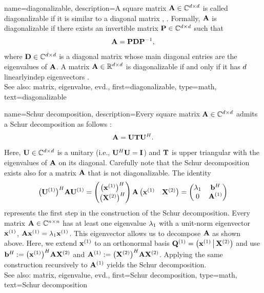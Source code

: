 {name={diagonalizable},
	description={A square \gls{matrix} ${\bf A} \in \mathbb{C}^{d \times d}$ 
		is called diagonalizable if it is similar  
 		to a diagonal \gls{matrix} \cite{HornMatAnalysis}, \cite{Axler2025}. 
 		Formally, ${\bf A}$ is diagonalizable if there exists an \gls{invertible} \gls{matrix} 
		$\mathbf{P} \in \mathbb{C}^{d \times d}$ such that 
  		\[
  			{\bf A} = \mathbf{P} {\bf D} \mathbf{P}^{-1},
  		\]
		where ${\bf D} \in \mathbb{C}^{d \times d}$ is a 
 		diagonal \gls{matrix} whose main diagonal entries are the \glspl{eigenvalue} 
 		of ${\bf A}$. A \gls{matrix} ${\bf A} \in \mathbb{R}^{d \times d}$ 
 		is diagonalizable if and only if it has $d$ \gls{linearlyindep}
 		\glspl{eigenvector} \cite{HornMatAnalysis}. 
 		\\	
 		See also: \gls{matrix}, \gls{eigenvalue}, \gls{evd}.},
 	first={diagonalizable},
 	type=math,
 	text={diagonalizable}
}

{name={Schur decomposition},
	description={Every square \gls{matrix} ${\bf A} \in \mathbb{C}^{d \times d}$ 
		admits a Schur decomposition as follows \cite[Th. 7.1.3]{GolubVanLoanBook}:
		\[
		{\bf A} = \mathbf{U} \mathbf{T} \mathbf{U}^{H}. 
		\]
		Here, $\mathbf{U} \in \mathbb{C}^{d \times d}$ is a \gls{unitary} 
		(i.e., $\mathbf{U}^{H}\mathbf{U} = \mathbf{I}$) and $\mathbf{T}$ is upper triangular 
		with the \glspl{eigenvalue} of ${\bf A}$ on its diagonal.
		Carefully note that the Schur decomposition exists also 
		for a \gls{matrix} ${\bf A}$ that is not \gls{diagonalizable}.
		The identity
		\[
			\big(\mathbf{U}^{(1)}\big)^{H} {\bf A} \mathbf{U}^{(1)}
			=
			\begin{pmatrix}
			\big({\bf x}^{(1)}\big)^{H} \\
			\big({\bf X}^{(2)}\big)^{H}
			\end{pmatrix}
			{\bf A}
			\begin{pmatrix}
			{\bf x}^{(1)} & {\bf X}^{(2)}
			\end{pmatrix}
			=
			\begin{pmatrix}
			\lambda_{1} & {\bf b}^{H} \\
			0 & {\bf A}^{(1)}
			\end{pmatrix}
		\]
		represents the first step in the construction of the Schur decomposition.
		Every \gls{matrix} ${\bf A} \in \mathbb{C}^{n\times n}$ has at least one 
		\gls{eigenvalue} $\lambda_{1}$ with a unit-\gls{norm} \gls{eigenvector} 
		${\bf x}^{(1)}$, ${\bf A} {\bf x}^{(1)} = \lambda_{1} {\bf x}^{(1)}$. This 
		\gls{eigenvector} allows us to decompose ${\bf A}$ as shown above. Here, 
		we extend ${\bf x}^{(1)}$ to an orthonormal \gls{basis}
		$\mathbf{Q}^{(1)} = \big( {\bf x}^{(1)} \,\big|\, {\bf X}^{(2)} \big)$
		and use ${\bf b}^{H} := \big({\bf x}^{(1)}\big)^{H} {\bf A} {\bf X}^{(2)}$ and 
		${\bf A}^{(1)} := \big({\bf X}^{(2)}\big)^{H} {\bf A} {\bf X}^{(2)}$.
		Applying the same construction recursively to ${\bf A}^{(1)}$ yields the 
		Schur decomposition.
		\\
 		See also: \gls{matrix}, \gls{eigenvalue}, \gls{evd}.},
	first={Schur decomposition},
	type=math,
	text={Schur decomposition}
}

